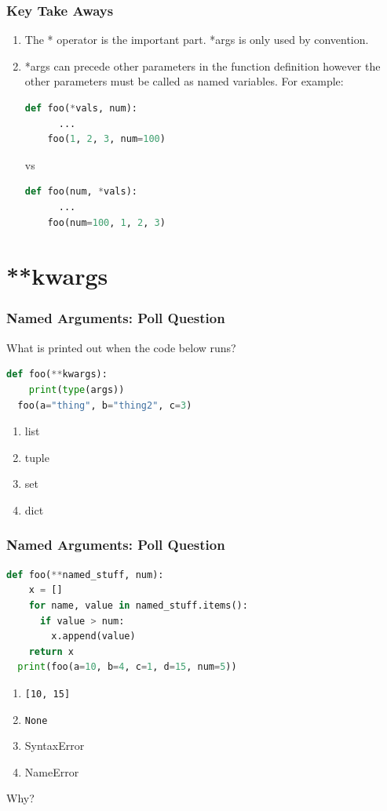\documentclass{beamer}
\begin{document}
%
%
\begin{frame}[fragile]
  \frametitle{Key Take Aways}
  \begin{enumerate}[A]
    \item The * operator is the important part. *args is only used by convention.
    \pause
    \item *args can precede other parameters in the function definition however the other parameters must be called as named variables. For example:
    \pause
    \begin{lstlisting}[language=Python, autogobble]
    def foo(*vals, num):
      ...
    foo(1, 2, 3, num=100)
    \end{lstlisting}
    \vfill
    vs
    \vfill
    \begin{lstlisting}[language=Python, autogobble]
    def foo(num, *vals):
      ...
    foo(num=100, 1, 2, 3)
    \end{lstlisting}
  \end{enumerate}
\end{frame}


\section{**kwargs}

%
%
\begin{frame}[fragile]
  \frametitle{Named Arguments: Poll Question}
  What is printed out when the code below runs?
  \begin{lstlisting}[language=Python, autogobble]
  def foo(**kwargs):
    print(type(args))
  foo(a="thing", b="thing2", c=3)
  \end{lstlisting}
  \vfill
  \begin{enumerate}[A]
    \item list
    \item tuple
    \item set
    \item dict
  \end{enumerate}
\end{frame}


%
%
\begin{frame}[fragile]
  \frametitle{Named Arguments: Poll Question}
  \begin{lstlisting}[language=Python, autogobble]
  def foo(**named_stuff, num):
    x = []
    for name, value in named_stuff.items():
      if value > num:
        x.append(value)
    return x
  print(foo(a=10, b=4, c=1, d=15, num=5))
  \end{lstlisting}
  \vfill
  \begin{enumerate}[A]
    \item \lstinline|[10, 15]|
    \item \lstinline|None|
    \item SyntaxError
    \item NameError
  \end{enumerate}
  \pause
  \vfill
  Why?
\end{frame}
\end{document}
